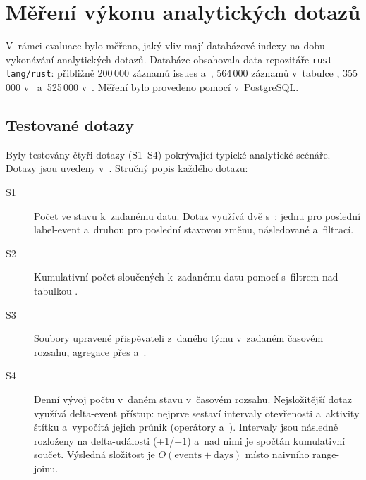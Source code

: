 
\section{Měření výkonu analytických dotazů}
\label{sec:evaluace:sql}

V~rámci evaluace bylo měřeno, jaký vliv mají databázové indexy na dobu vykonávání analytických dotazů. Databáze obsahovala data repozitáře \texttt{rust-lang/rust}: přibližně 200\,000 záznamů issues a~\PR, 564\,000 záznamů v~tabulce , 355\,000 v~ a~525\,000 v~. Měření bylo provedeno pomocí  v~PostgreSQL.

\subsection{Testované dotazy}
\label{subsec:evaluace:sql:dotazy}

Byly testovány čtyři dotazy (S1--S4) pokrývající typické analytické scénáře. Dotazy jsou uvedeny v~. Stručný popis každého dotazu:

\begin{description}
  \item[S1] Počet \PR ve stavu  k~zadanému datu. Dotaz využívá dvě \CTE s~: jednu pro poslední label-event a~druhou pro poslední stavovou změnu, následované  a~filtrací.
  \item[S2] Kumulativní počet sloučených \PR k~zadanému datu pomocí  s~filtrem  nad tabulkou .
  \item[S3] Soubory upravené přispěvateli z~daného týmu v~zadaném časovém rozsahu, agregace přes  a~.
  \item[S4] Denní vývoj počtu \PR v~daném stavu v~časovém rozsahu. Nejsložitější dotaz využívá delta-event přístup: nejprve sestaví intervaly otevřenosti a~aktivity štítku a~vypočítá jejich průnik (operátory \code{\&\&} a~\code{*}). Intervaly jsou následně rozloženy na delta-události (+1/$-1$) a~nad nimi je spočtán kumulativní součet. Výsledná složitost je $O(\text{events} + \text{days})$ místo naivního range-joinu.
\end{description}

